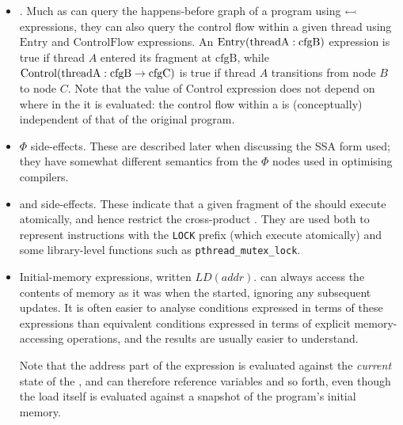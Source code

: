 \begin{itemize}
\item
  .  Much as {\StateMachines}
  can query the happens-before graph of a program using
  $\leftarrowtail$ expressions, they can also query the control
  flow within a given thread using $\mathrm{Entry}$ and
  $\mathrm{ControlFlow}$ expressions.  An
  $\mathrm{Entry}(\mathrm{threadA}:\mathrm{cfgB})$ expression is true if thread $A$
  entered its  fragment at $\mathrm{cfgB}$, while
  $\mathrm{Control}(\mathrm{threadA}:\mathrm{cfgB} \rightarrow \mathrm{cfgC})$ is true if thread $A$
  transitions from  node $B$ to node $C$.  Note that the
  value of $\mathrm{Control}$ expression does not depend on where in
  the {\StateMachine} it is evaluated: the control flow within a
  {\StateMachine} is (conceptually) independent of that of the
  original program.
\item
  $\Phi$ side-effects.  These are described later when discussing the
  SSA form used; they have somewhat different semantics from the
  $\Phi$ nodes used in optimising compilers.
\item
   and  side-effects.  These
  indicate that a given fragment of the {\StateMachine} should execute
  atomically, and hence restrict the cross-product
  {\StateMachine}.  They are used both to represent instructions with
  the \verb|LOCK| prefix (which execute atomically) and some
  library-level functions such as
  \verb|pthread_mutex_lock|.
\item
  Initial-memory expressions, written $LD(addr)$.  {\STateMachines}
  can always access the contents of memory as it was when the
  {\StateMachine} started, ignoring any subsequent updates.  It is
  often easier to analyse conditions expressed in terms of these
  expressions than equivalent conditions expressed in terms of
  explicit memory-accessing operations, and the results are usually
  easier to understand.

  Note that the address part of the expression is evaluated against
  the \emph{current} state of the {\StateMachine}, and can therefore
  reference {\StateMachine} variables and so forth, even though the
  load itself is evaluated against a snapshot of the program's initial
  memory.
\end{itemize}

